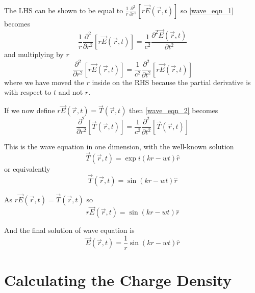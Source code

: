    The LHS can be shown to be equal to $\frac{1}{r}\frac{\partial^2}{\partial r^2}[r\vec{E}(\vec{r},t)]$ so \eqref{wave_eqn_1} becomes
%
   \begin{equation}
   \frac{1}{r}\frac{\partial^2}{\partial r^2}[r\vec{E}(\vec{r},t)] = \frac{1}{c^2}\frac{\partial^2\vec{E}(\vec{r},t)}{\partial t^2} 
   \end{equation}
%
and multiplying by $r$
%
   \begin{equation}\label{wave_eqn_2}
   \frac{\partial^2}{\partial r^2}[r\vec{E}(\vec{r},t)] = \frac{1}{c^2}\frac{\partial^2}{\partial t^2}[r\vec{E}(\vec{r},t)]
   \end{equation}
%
where we have moved the $r$ inside on the RHS because the partial derivative is with respect to $t$ and not $r$.

If we now define $r\vec{E}(\vec{r},t) = \vec{T}(\vec{r},t)$ then \eqref{wave_eqn_2} becomes
%
   \begin{equation}
   \frac{\partial^2}{\partial r^2}[\vec{T}(\vec{r},t)] = \frac{1}{c^2}\frac{\partial^2}{\partial t^2}[\vec{T}(\vec{r},t)]
   \end{equation}

This is the wave equation in one dimension, with the well-known solution
%
\begin{equation}
\vec{T}(\vec{r},t) = \exp{i(kr-wt)}\hat{r}
\end{equation}
%
or equivalently
%
\begin{equation}
   \vec{T}(\vec{r},t) = \sin(kr-wt) \hat{r}
\end{equation}

As $r \vec{E}(\vec{r},t) = \vec{T}(\vec{r},t)$ so
%
   \begin{equation}
      r\vec{E}(\vec{r},t) = \sin(kr-wt) \hat{r}
   \end{equation}

And the final solution of wave equation is
%
\begin{equation}
   \vec{E}(\vec{r},t) = \frac{1}{r}\sin(kr-wt) \hat{r}
\end{equation}



\section{Calculating the Charge Density}

